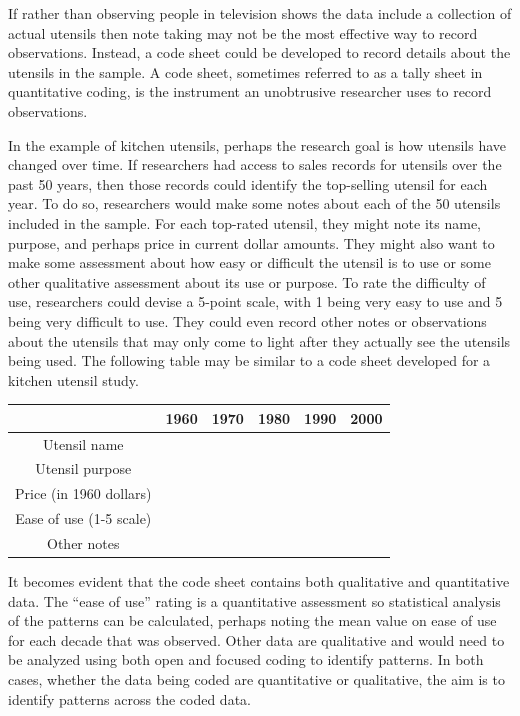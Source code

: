 If rather than observing people in television shows the data include a collection of actual utensils then note taking may not be the most effective way to record observations. Instead, a code sheet could be developed to record details about the utensils in the sample. A code sheet, sometimes referred to as a tally sheet in quantitative coding, is the instrument an unobtrusive researcher uses to record observations.

In the example of kitchen utensils, perhaps the research goal is how utensils have changed over time. If researchers had access to sales records for utensils over the past 50 years, then those records could identify the top-selling utensil for each year. To do so, researchers would make some notes about each of the 50 utensils included in the sample. For each top-rated utensil, they might note its name, purpose, and perhaps price in current dollar amounts. They might also want to make some assessment about how easy or difficult the utensil is to use or some other qualitative assessment about its use or purpose. To rate the difficulty of use, researchers could devise a 5-point scale, with 1 being very easy to use and 5 being very difficult to use. They could even record other notes or observations about the utensils that may only come to light after they actually see the utensils being used. The following table may be similar to a code sheet developed for a kitchen utensil study. 

\bigskip
\begin{tabular}{|c|c|c|c|c|c|}
	\hline 
	& 1960  & 1970 & 1980 & 1990 & 2000 \\ 
	\hline 
	Utensil name &  &  &  &  &  \\ 
	\hline 
	Utensil purpose &  &  &  &  &  \\ 
	\hline 
	Price (in 1960 dollars) &  &  &  &  &  \\ 
	\hline 
	Ease of use (1-5 scale) &  &  &  &  &  \\ 
	\hline 
	Other notes &  &  &  &  &  \\ 
	\hline 
\end{tabular}  
\bigskip

It becomes evident that the code sheet contains both qualitative and quantitative data. The ``ease of use'' rating is a quantitative assessment so statistical analysis of the patterns can be calculated, perhaps noting the mean value on ease of use for each decade that was observed. Other data are qualitative and would need to be analyzed using both open and focused coding to identify patterns. In both cases, whether the data being coded are quantitative or qualitative, the aim is to identify patterns across the coded data.

